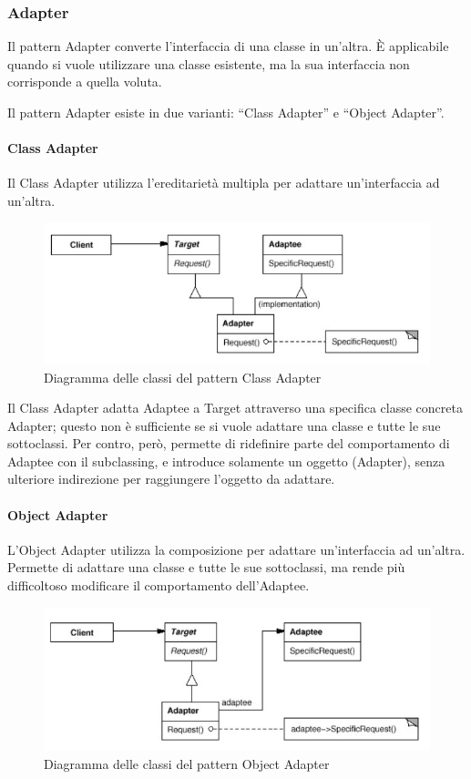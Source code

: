 \subsubsection{Adapter}
\label{ssub:adapter}

Il pattern Adapter converte l'interfaccia di una classe in un'altra. \`E
applicabile quando si vuole utilizzare una classe esistente, ma la sua
interfaccia non corrisponde a quella voluta.

Il pattern Adapter esiste in due varianti: ``Class Adapter'' e ``Object
Adapter''.

\paragraph{Class Adapter}
\label{par:class_adapter}

Il Class Adapter utilizza l'ereditarietà multipla per adattare un'interfaccia
ad un'altra.

\begin{figure}[h!]
  \centering
  \includegraphics[scale=0.55]{imgs/class_adapter.jpg}
  \caption{Diagramma delle classi del pattern Class Adapter}
\end{figure}

Il Class Adapter adatta Adaptee a Target attraverso una specifica classe
concreta Adapter; questo non è sufficiente se si vuole adattare una classe
e tutte le sue sottoclassi. Per contro, però, permette di ridefinire parte del
comportamento di Adaptee con il subclassing, e introduce solamente un oggetto
(Adapter), senza ulteriore indirezione per raggiungere l'oggetto da adattare.

\paragraph{Object Adapter}
\label{par:object_adapter}

L'Object Adapter utilizza la composizione per adattare un'interfaccia ad
un'altra. Permette di adattare una classe e tutte le sue sottoclassi, ma rende
più difficoltoso modificare il comportamento dell'Adaptee.

\begin{figure}[h!]
  \centering
  \includegraphics[scale=0.55]{imgs/object_adapter.jpg}
  \caption{Diagramma delle classi del pattern Object Adapter}
\end{figure}
